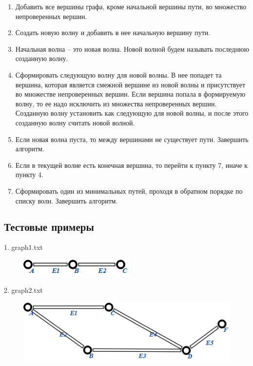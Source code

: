 \begin{enumerate}
\item Добавить все вершины графа, кроме начальной вершины пути, во
  множество непроверенных вершин.

\item Создать новую волну и добавить в нее начальную вершину пути.

\item Начальная волна – это новая волна. Новой волной будем называть
  последнюю созданную волну.

\item Сформировать следующую волну для новой волны. В нее попадет та
  вершина, которая является смежной вершине из новой волны и
  присутствует во множестве непроверенных вершин. Если вершина попала
  в формируемую волну, то ее надо исключить из множества непроверенных
  вершин. Созданную волну установить как следующую для новой волны, и
  после этого созданную волну считать новой волной.

\item Если новая волна пуста, то между вершинами не существует
  пути. Завершить алгоритм.

\item Если в текущей волне есть конечная вершина, то перейти к пункту
  7, иначе к пункту 4.

\item Сформировать один из минимальных путей, проходя в обратном
  порядке по списку волн. Завершить алгоритм.
\end{enumerate}

\subsection{Тестовые примеры}

1.	graph1.txt

\begin{figure}[h!]
  \centering
  \includegraphics{images/1/test/1}
\end{figure}

2.	graph2.txt

\begin{figure}[h!]
  \centering
  \includegraphics{images/1/test/2}
\end{figure}

